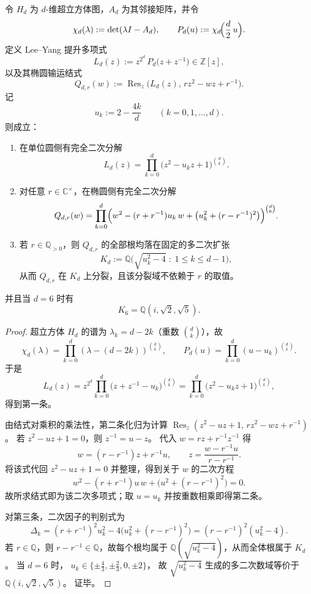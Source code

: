 \begin{theorem}\label{thm:xi-hypercube-leyang-lift-complete-quadratic-factorization-scale-invariant-splitting}
令 \(H_d\) 为 \(d\)-维超立方体图，\(A_d\) 为其邻接矩阵，并令
\[
\chi_d(\lambda):=\det(\lambda I-A_d),
\qquad
P_d(u):=\chi_d\!\Bigl(\frac d2\,u\Bigr).
\]
定义 Lee--Yang 提升多项式
\[
L_d(z):=z^{2^d}\,P_d\!\bigl(z+z^{-1}\bigr)\in\mathbb Z[z],
\]
以及其椭圆输运结式
\[
Q_{d,r}(w):=\operatorname{Res}_z\!\bigl(L_d(z),\,rz^2-wz+r^{-1}\bigr).
\]
记
\[
u_k:=2-\frac{4k}{d}\qquad(k=0,1,\dots,d).
\]
则成立：
\begin{enumerate}
  \item 在单位圆侧有完全二次分解
  \[
  L_d(z)=\prod_{k=0}^{d}\bigl(z^2-u_k z+1\bigr)^{\binom{d}{k}}.
  \]
  \item 对任意 \(r\in\mathbb C^{\times}\)，在椭圆侧有完全二次分解
  \[
  Q_{d,r}(w)=\prod_{k=0}^{d}
  \Bigl(w^2-(r+r^{-1})u_k\,w+\bigl(u_k^2+(r-r^{-1})^2\bigr)\Bigr)^{\binom{d}{k}}.
  \]
  \item 若 \(r\in\mathbb Q_{>0}\)，则 \(Q_{d,r}\) 的全部根均落在固定的多二次扩张
  \[
  K_d:=\mathbb Q\bigl(\sqrt{u_k^2-4}\;:\;1\le k\le d-1\bigr),
  \]
  从而 \(Q_{d,r}\) 在 \(K_d\) 上分裂，且该分裂域不依赖于 \(r\) 的取值。
\end{enumerate}
并且当 \(d=6\) 时有
\[
K_6=\mathbb Q(i,\sqrt2,\sqrt5).
\]
\end{theorem}
\begin{proof}
超立方体 \(H_d\) 的谱为 \(\lambda_k=d-2k\)（重数 \(\binom{d}{k}\)），故
\[
\chi_d(\lambda)=\prod_{k=0}^d(\lambda-(d-2k))^{\binom{d}{k}},
\qquad
P_d(u)=\prod_{k=0}^d(u-u_k)^{\binom{d}{k}}.
\]
于是
\[
L_d(z)=z^{2^d}\prod_{k=0}^d\bigl(z+z^{-1}-u_k\bigr)^{\binom{d}{k}}
=\prod_{k=0}^d\bigl(z^2-u_k z+1\bigr)^{\binom{d}{k}},
\]
得到第一条。

由结式对乘积的乘法性，第二条化归为计算
\(
\operatorname{Res}_z(z^2-uz+1,\,rz^2-wz+r^{-1})
\)。
若 \(z^2-uz+1=0\)，则 \(z^{-1}=u-z\)。
代入 \(w=rz+r^{-1}z^{-1}\) 得
\[
w=(r-r^{-1})z+r^{-1}u,\qquad
z=\frac{w-r^{-1}u}{r-r^{-1}}.
\]
将该式代回 \(z^2-uz+1=0\) 并整理，得到关于 \(w\) 的二次方程
\[
w^2-(r+r^{-1})u\,w+\bigl(u^2+(r-r^{-1})^2\bigr)=0.
\]
故所求结式即为该二次多项式；取 \(u=u_k\) 并按重数相乘即得第二条。

对第三条，二次因子的判别式为
\[
\Delta_k=(r+r^{-1})^2u_k^2-4\bigl(u_k^2+(r-r^{-1})^2\bigr)
=(r-r^{-1})^2(u_k^2-4).
\]
若 \(r\in\mathbb Q\)，则 \(r-r^{-1}\in\mathbb Q\)，故每个根均属于 \(\mathbb Q(\sqrt{u_k^2-4})\)，从而全体根属于 \(K_d\)。
当 \(d=6\) 时，
\(
u_k\in\{\pm\frac43,\pm\frac23,0,\pm2\}
\)，
故 \(\sqrt{u_k^2-4}\) 生成的多二次数域等价于 \(\mathbb Q(i,\sqrt2,\sqrt5)\)。
证毕。
\end{proof}

